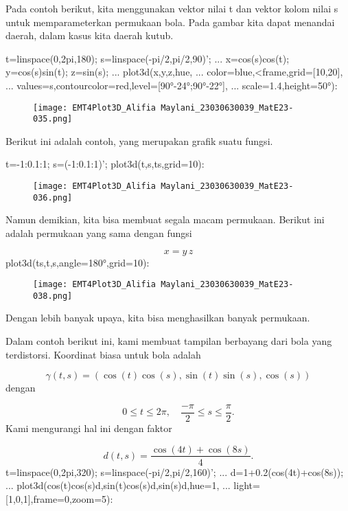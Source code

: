 \documentclass{article}
\begin{document}
Pada contoh berikut, kita menggunakan vektor nilai t dan vektor kolom
nilai s untuk memparameterkan permukaan bola. Pada gambar kita dapat
menandai daerah, dalam kasus kita daerah kutub.


\>t=linspace(0,2pi,180); s=linspace(-pi/2,pi/2,90)'; ...  
\>   x=cos(s)\*cos(t); y=cos(s)\*sin(t); z=sin(s); ...  
\>   plot3d(x,y,z,\>hue, ...  
\>   color=blue,<frame,grid=[10,20], ...  
\>   values=s,contourcolor=red,level=[90°-24°;90°-22°], ...  
\>   scale=1.4,height=50°):


\begin{figure}
    \centering
    \texttt{[image: EMT4Plot3D\_Alifia Maylani\_23030630039\_MatE23-035.png]}
    \caption{}
    \label{fig:enter-label}
\end{figure}

Berikut ini adalah contoh, yang merupakan grafik suatu fungsi.


\>t=-1:0.1:1; s=(-1:0.1:1)'; plot3d(t,s,t\*s,grid=10):


\begin{figure}
    \centering
    \texttt{[image: EMT4Plot3D\_Alifia Maylani\_23030630039\_MatE23-036.png]}
    \caption{}
    \label{fig:enter-label}
\end{figure}

Namun demikian, kita bisa membuat segala macam permukaan. Berikut ini
adalah permukaan yang sama dengan fungsi


$$x = y \, z$$\>plot3d(t\*s,t,s,angle=180°,grid=10):


\begin{figure}
    \centering
    \texttt{[image: EMT4Plot3D\_Alifia Maylani\_23030630039\_MatE23-038.png]}
    \caption{}
    \label{fig:enter-label}
\end{figure}

Dengan lebih banyak upaya, kita bisa menghasilkan banyak permukaan.


Dalam contoh berikut ini, kami membuat tampilan berbayang dari bola
yang terdistorsi. Koordinat biasa untuk bola adalah


$$\gamma(t,s) = (\cos(t)\cos(s),\sin(t)\sin(s),\cos(s))$$dengan


$$0 \le t \le 2\pi, \quad \frac{-\pi}{2} \le s \le \frac{\pi}{2}.$$Kami mengurangi hal ini dengan faktor


$$d(t,s) = \frac{\cos(4t)+\cos(8s)}{4}.$$\>t=linspace(0,2pi,320); s=linspace(-pi/2,pi/2,160)'; ...  
\>   d=1+0.2\*(cos(4\*t)+cos(8\*s)); ...  
\>   plot3d(cos(t)\*cos(s)\*d,sin(t)\*cos(s)\*d,sin(s)\*d,hue=1, ...  
\>     light=[1,0,1],frame=0,zoom=5):
\end{document}
